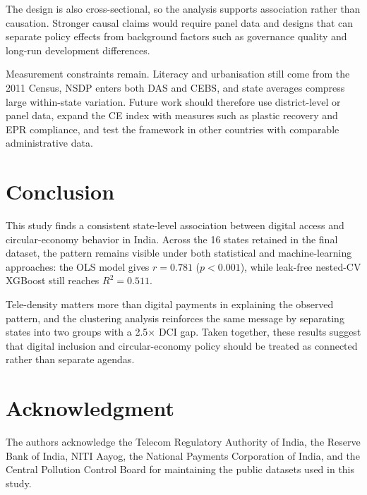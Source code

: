 \documentclass[conference]{IEEEtran}
\begin{document}
The design is also cross-sectional, so the analysis supports association rather than causation. Stronger causal claims would require panel data and designs that can separate policy effects from background factors such as governance quality and long-run development differences.

Measurement constraints remain. Literacy and urbanisation still come from the 2011 Census, NSDP enters both DAS and CEBS, and state averages compress large within-state variation. Future work should therefore use district-level or panel data, expand the CE index with measures such as plastic recovery and EPR compliance, and test the framework in other countries with comparable administrative data.

\section{Conclusion}

This study finds a consistent state-level association between digital access and circular-economy behavior in India. Across the 16 states retained in the final dataset, the pattern remains visible under both statistical and machine-learning approaches: the OLS model gives $r = 0.781$ ($p < 0.001$), while leak-free nested-CV XGBoost still reaches $R^2 = 0.511$.

Tele-density matters more than digital payments in explaining the observed pattern, and the clustering analysis reinforces the same message by separating states into two groups with a 2.5$\times$ DCI gap. Taken together, these results suggest that digital inclusion and circular-economy policy should be treated as connected rather than separate agendas.

\section*{Acknowledgment}

The authors acknowledge the Telecom Regulatory Authority of India, the Reserve Bank of India, NITI Aayog, the National Payments Corporation of India, and the Central Pollution Control Board for maintaining the public datasets used in this study.
\end{document}
